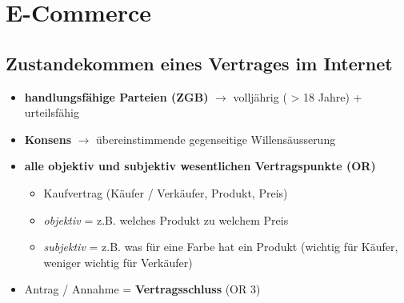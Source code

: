 \section{E-Commerce}

\subsection{Zustandekommen eines Vertrages im Internet}
\begin{itemize}
    \item \textbf{handlungsfähige Parteien (ZGB)} $\rightarrow$ volljährig ( > 18 Jahre) + urteilsfähig
    \item \textbf{Konsens} $\rightarrow$ übereinstimmende gegenseitige Willensäusserung
    \item \textbf{alle objektiv und subjektiv wesentlichen Vertragspunkte (OR)}
    \begin{itemize}
        \item Kaufvertrag (Käufer / Verkäufer, Produkt, Preis)
        \item \textit{objektiv} = z.B. welches Produkt zu welchem Preis
        \item \textit{subjektiv} = z.B. was für eine Farbe hat ein Produkt (wichtig für Käufer, weniger wichtig für Verkäufer)
    \end{itemize}
    \item Antrag / Annahme = \textbf{Vertragsschluss} (OR 3)
\end{itemize}


